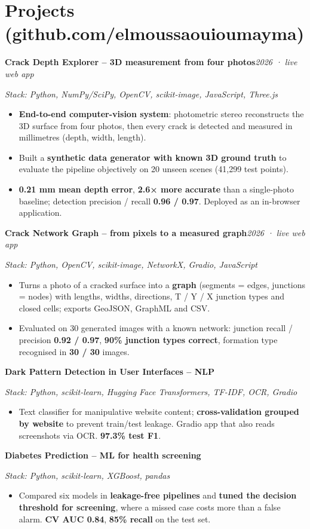 \documentclass[10pt,a4paper]{article}
\newcommand{\project}[2]{\par\needspace{4\baselineskip}\vspace{4pt}\noindent\textbf{#1}\hfill\textit{#2}\par}
\newcommand{\projectx}[3]{\project{#1}{#2}\noindent\textit{Stack: #3}\par}
\begin{document}
\section{Projects (github.com/elmoussaouioumayma)}
\projectx{Crack Depth Explorer -- 3D measurement from four photos}{2026 · live web app}{Python, NumPy/SciPy, OpenCV, scikit-image, JavaScript, Three.js}
\begin{itemize}
  \item \textbf{End-to-end computer-vision system}: photometric stereo reconstructs the 3D surface from four photos, then every crack is detected and measured in millimetres (depth, width, length).
  \item Built a \textbf{synthetic data generator with known 3D ground truth} to evaluate the pipeline objectively on 20 unseen scenes (41,299 test points).
  \item \textbf{0.21 mm mean depth error}, \textbf{2.6× more accurate} than a single-photo baseline; detection precision / recall \textbf{0.96 / 0.97}. Deployed as an in-browser application.
\end{itemize}

\projectx{Crack Network Graph -- from pixels to a measured graph}{2026 · live web app}{Python, OpenCV, scikit-image, NetworkX, Gradio, JavaScript}
\begin{itemize}
  \item Turns a photo of a cracked surface into a \textbf{graph} (segments = edges, junctions = nodes) with lengths, widths, directions, T / Y / X junction types and closed cells; exports GeoJSON, GraphML and CSV.
  \item Evaluated on 30 generated images with a known network: junction recall / precision \textbf{0.92 / 0.97}, \textbf{90\% junction types correct}, formation type recognised in \textbf{30 / 30} images.
\end{itemize}

\projectx{Dark Pattern Detection in User Interfaces -- NLP}{}{Python, scikit-learn, Hugging Face Transformers, TF-IDF, OCR, Gradio}
\begin{itemize}
  \item Text classifier for manipulative website content; \textbf{cross-validation grouped by website} to prevent train/test leakage. Gradio app that also reads screenshots via OCR. \textbf{97.3\% test F1}.
\end{itemize}

\projectx{Diabetes Prediction -- ML for health screening}{}{Python, scikit-learn, XGBoost, pandas}
\begin{itemize}
  \item Compared six models in \textbf{leakage-free pipelines} and \textbf{tuned the decision threshold for screening}, where a missed case costs more than a false alarm. \textbf{CV AUC 0.84}, \textbf{85\% recall} on the test set.
\end{itemize}
\end{document}
